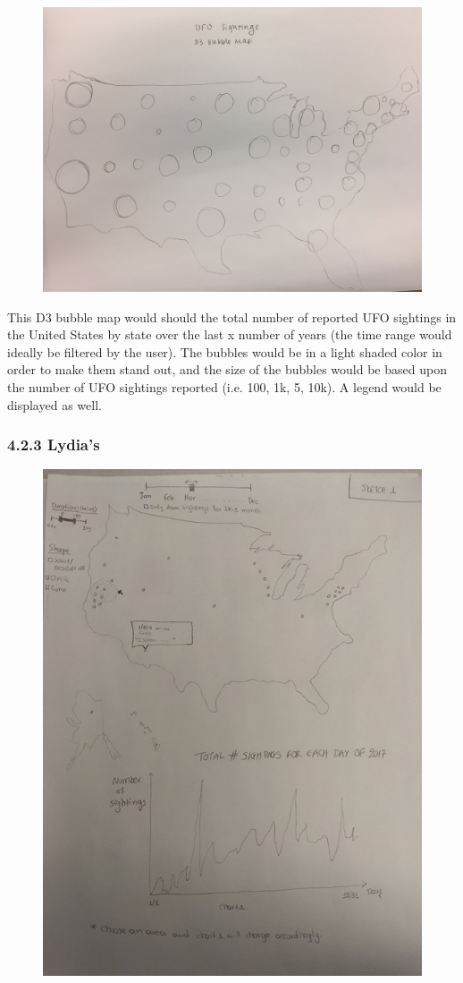 \documentclass{neu_handout}
\begin{document}
\newpage

\begin{figure}[h]
\centering
{
\includegraphics[width=0.9\linewidth]{emily2}
}
\end{figure}

This D3 bubble map would should the total number of reported UFO sightings in the United States by state over the last x number of years (the time range would ideally be filtered by the user). The bubbles would be in a light shaded color in order to make them stand out, and the size of the bubbles would be based upon the number of UFO sightings reported (i.e. 100, 1k, 5, 10k). A legend would be displayed as well.

\newpage

\subsubsection*{4.2.3 Lydia's}

\begin{figure}[h]
\centering
{
\includegraphics[width=0.7\linewidth]{lydia1}
}
\end{figure}
\end{document}
